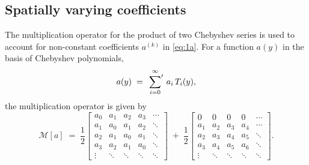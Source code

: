 \documentclass[%
secnumarabic,%
 amssymb, amsmath,%
 aps,prf,superscriptaddress,longbibliography
frontmatterverbose,
]{revtex4-2}
\begin{document}
\subsection{Spatially varying coefficients}
The multiplication operator for the product of two Chebyshev series is used to account for non-constant coefficients $a^{(k)}$ in \eqref{eq:1a}. For a function $a(y)$ in the basis of Chebyshev polynomials, 
\begin{equation}
  a(y) \;=\; \sideset{}{'}\sum_{i=0}^{\infty}\,a_i \,T_i(y),
\end{equation}
the multiplication operator is given by~\cite[Section 3]{DuSIAM2016}
\begin{equation}\label{eq:M}
  \mathcal M[a] \;=\; \frac{1}{2}\left[\begin{array}{ccccc}
    a_0 & a_1 & a_2 & a_3 & \cdots\\
    a_1 & a_0 & a_1 & a_2 & \ddots\\
    a_2 & a_1 & a_0 & a_1 & \ddots\\
    a_3 & a_2 & a_1 & a_0 & \ddots\\
    \vdots & \ddots & \ddots & \ddots& \ddots
  \end{array}\right] \;+\; \frac{1}{2}\left[\begin{array}{ccccc}
    0 & 0 & 0 & 0 & \cdots\\
    a_1 & a_2 & a_3 & a_4 & \cdots\\
    a_2 & a_3 & a_4 & a_5 & \ddots\\
    a_3 & a_4 & a_5 & a_6 & \ddots\\
    \vdots & \ddots & \ddots & \ddots& \ddots
  \end{array}\right] .
\end{equation}
\end{document}
